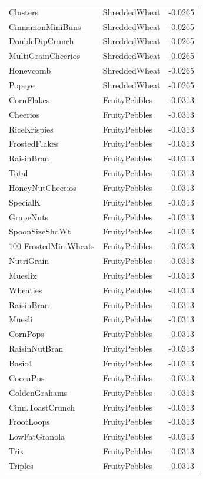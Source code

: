 \begin{longtable}{llr}
Clusters & ShreddedWheat & -0.0265 \\
CinnamonMiniBuns & ShreddedWheat & -0.0265 \\
DoubleDipCrunch & ShreddedWheat & -0.0265 \\
MultiGrainCheerios & ShreddedWheat & -0.0265 \\
Honeycomb & ShreddedWheat & -0.0265 \\
Popeye & ShreddedWheat & -0.0265 \\
CornFlakes & FruityPebbles & -0.0313 \\
Cheerios & FruityPebbles & -0.0313 \\
RiceKrispies & FruityPebbles & -0.0313 \\
FrostedFlakes & FruityPebbles & -0.0313 \\
RaisinBran & FruityPebbles & -0.0313 \\
Total & FruityPebbles & -0.0313 \\
HoneyNutCheerios & FruityPebbles & -0.0313 \\
SpecialK & FruityPebbles & -0.0313 \\
GrapeNuts & FruityPebbles & -0.0313 \\
SpoonSizeShdWt & FruityPebbles & -0.0313 \\
100%
FrostedMiniWheats & FruityPebbles & -0.0313 \\
NutriGrain & FruityPebbles & -0.0313 \\
Mueslix & FruityPebbles & -0.0313 \\
Wheaties & FruityPebbles & -0.0313 \\
RaisinBran & FruityPebbles & -0.0313 \\
Muesli & FruityPebbles & -0.0313 \\
CornPops & FruityPebbles & -0.0313 \\
RaisinNutBran & FruityPebbles & -0.0313 \\
Basic4 & FruityPebbles & -0.0313 \\
CocoaPus & FruityPebbles & -0.0313 \\
GoldenGrahams & FruityPebbles & -0.0313 \\
Cinn.ToastCrunch & FruityPebbles & -0.0313 \\
FrootLoops & FruityPebbles & -0.0313 \\
LowFatGranola & FruityPebbles & -0.0313 \\
Trix & FruityPebbles & -0.0313 \\
Triples & FruityPebbles & -0.0313 \\

\end{longtable}
